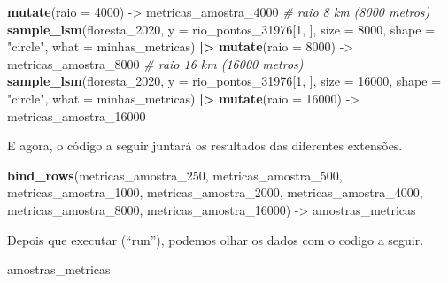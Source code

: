 \documentclass[
]{article}
\newenvironment{Shaded}{\begin{snugshade}}{\end{snugshade}}
\newcommand{\AttributeTok}[1]{\textcolor[rgb]{0.13,0.29,0.53}{#1}}
\newcommand{\CommentTok}[1]{\textcolor[rgb]{0.56,0.35,0.01}{\textit{#1}}}
\newcommand{\DecValTok}[1]{\textcolor[rgb]{0.00,0.00,0.81}{#1}}
\newcommand{\FunctionTok}[1]{\textcolor[rgb]{0.13,0.29,0.53}{\textbf{#1}}}
\newcommand{\NormalTok}[1]{#1}
\newcommand{\OtherTok}[1]{\textcolor[rgb]{0.56,0.35,0.01}{#1}}
\newcommand{\SpecialCharTok}[1]{\textcolor[rgb]{0.81,0.36,0.00}{\textbf{#1}}}
\newcommand{\StringTok}[1]{\textcolor[rgb]{0.31,0.60,0.02}{#1}}
\begin{document}
\begin{Shaded}
\begin{Highlighting}[]
  \FunctionTok{mutate}\NormalTok{(}\AttributeTok{raio =} \DecValTok{4000}\NormalTok{)  }\OtherTok{{-}\textgreater{}}\NormalTok{ metricas\_amostra\_4000}
\CommentTok{\# raio 8 km (8000 metros)}
\FunctionTok{sample\_lsm}\NormalTok{(floresta\_2020, }\AttributeTok{y =}\NormalTok{ rio\_pontos\_31976[}\DecValTok{1}\NormalTok{, ], }
           \AttributeTok{size =} \DecValTok{8000}\NormalTok{, }\AttributeTok{shape =} \StringTok{"circle"}\NormalTok{, }
           \AttributeTok{what =}\NormalTok{ minhas\_metricas)  }\SpecialCharTok{|\textgreater{}} 
  \FunctionTok{mutate}\NormalTok{(}\AttributeTok{raio =} \DecValTok{8000}\NormalTok{) }\OtherTok{{-}\textgreater{}}\NormalTok{ metricas\_amostra\_8000}
\CommentTok{\# raio 16 km (16000 metros)}
\FunctionTok{sample\_lsm}\NormalTok{(floresta\_2020, }\AttributeTok{y =}\NormalTok{ rio\_pontos\_31976[}\DecValTok{1}\NormalTok{, ], }
           \AttributeTok{size =} \DecValTok{16000}\NormalTok{, }\AttributeTok{shape =} \StringTok{"circle"}\NormalTok{, }
           \AttributeTok{what =}\NormalTok{ minhas\_metricas)  }\SpecialCharTok{|\textgreater{}} 
  \FunctionTok{mutate}\NormalTok{(}\AttributeTok{raio =} \DecValTok{16000}\NormalTok{) }\OtherTok{{-}\textgreater{}}\NormalTok{ metricas\_amostra\_16000}
\end{Highlighting}
\end{Shaded}

E agora, o código a seguir juntará os resultados das diferentes extensões.

\begin{Shaded}
\begin{Highlighting}[]
\FunctionTok{bind\_rows}\NormalTok{(metricas\_amostra\_250, }
\NormalTok{          metricas\_amostra\_500, }
\NormalTok{          metricas\_amostra\_1000, }
\NormalTok{          metricas\_amostra\_2000, }
\NormalTok{          metricas\_amostra\_4000, }
\NormalTok{          metricas\_amostra\_8000, }
\NormalTok{          metricas\_amostra\_16000) }\OtherTok{{-}\textgreater{}}\NormalTok{ amostras\_metricas}
\end{Highlighting}
\end{Shaded}

Depois que executar (``run''), podemos olhar os dados com o codigo a seguir.

\begin{Shaded}
\begin{Highlighting}[]
\NormalTok{amostras\_metricas}
\end{Highlighting}
\end{Shaded}
\end{document}
